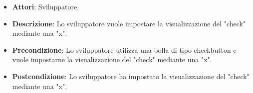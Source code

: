 
\FloatBarrier
\begin{itemize}
\item\textbf{Attori}: Sviluppatore.
\item\textbf{Descrizione}: Lo sviluppatore vuole impostare la visualizzazione del "check" mediante una "x".
\item\textbf{Precondizione}: Lo sviluppatore utilizza una bolla di tipo checkbutton e vuole impostarne la visualizzazione del "check" mediante una "x".
\item\textbf{Postcondizione}: Lo sviluppatore ha impostato la visualizzazione del "check" mediante una "x".
\end{itemize}
